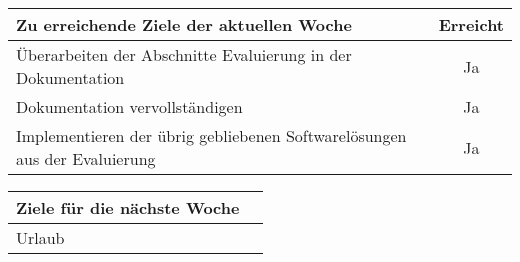 \begin{tabularx}{\textwidth}{Xc}
    \arrayrulecolor{OliveGreen}
    \toprule
    {\bfseries Zu erreichende Ziele der aktuellen Woche} & {\bfseries Erreicht} \\
    \midrule[2pt]
    Überarbeiten der Abschnitte Evaluierung in der Dokumentation &Ja              \\
    \rowcolor{OliveGreen!15}
    Dokumentation vervollständigen                         &Ja               \\
    \rowcolor{White}
    Implementieren der übrig gebliebenen Softwarelösungen aus der Evaluierung &Ja  \\
    \bottomrule[2pt]
\end{tabularx}
%
\vspace{1cm}
%
\begin{tabularx}{\textwidth}{Xc}
    \arrayrulecolor{OliveGreen}
    \toprule
    {\bfseries Ziele für die nächste Woche}        &                         \\
    \midrule[2pt]
    Urlaub                  &                         \\
\end{tabularx}
